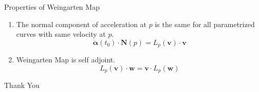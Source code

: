 \documentclass{beamer}
\begin{document}
\begin{frame}{Properties of Weingarten Map}
	\begin{enumerate}
		\item The normal component of acceleration at $p$ is the same for all parametrized curves with same velocity at $p$.
			$$\ddot{\boldsymbol{\alpha}}(t_0) \cdot \boldsymbol{N}(p) = L_p(\boldsymbol{v}) \cdot \boldsymbol{v}$$
		\item Weingarten Map is self adjoint.
			$$ L_p(\boldsymbol{v}) \cdot \boldsymbol{w} = \boldsymbol{v} \cdot L_p(\boldsymbol{w}) $$
	\end{enumerate}
\end{frame}

\begin{frame}
	\vspace{0.6in}
	\hspace{3cm} {\color{blue}\Huge{Thank You}}
\end{frame}
\end{document}
